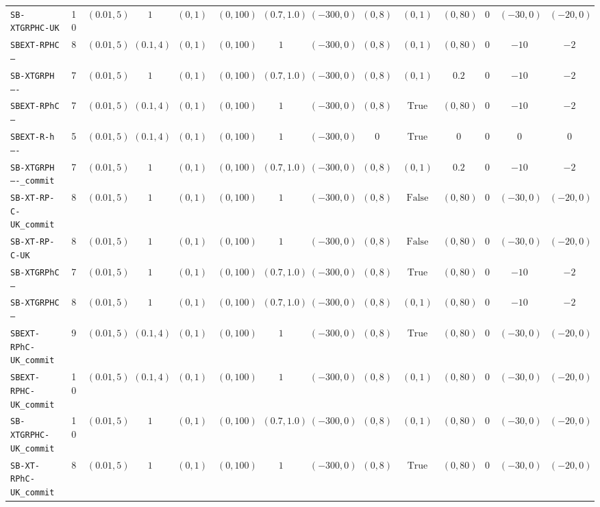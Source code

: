 {\begin{tabular}{lccccccccccccc}
\texttt{SB-XTGRPHC-UK} & 10 & $(0.01,5)$ & $1$ & $(0,1)$ & $(0,100)$ & $(0.7,1.0)$ & $(-300,0)$ & $(0,8)$ & $(0,1)$ & $(0,80)$ & $0$ & $(-30,0)$ & $(-20,0)$ \\
\texttt{SBEXT-RPHC---} & 8 & $(0.01,5)$ & $(0.1,4)$ & $(0,1)$ & $(0,100)$ & $1$ & $(-300,0)$ & $(0,8)$ & $(0,1)$ & $(0,80)$ & $0$ & $-10$ & $-2$ \\
\texttt{SB-XTGRPH----} & 7 & $(0.01,5)$ & $1$ & $(0,1)$ & $(0,100)$ & $(0.7,1.0)$ & $(-300,0)$ & $(0,8)$ & $(0,1)$ & $0.2$ & $0$ & $-10$ & $-2$ \\
\texttt{SBEXT-RPhC---} & 7 & $(0.01,5)$ & $(0.1,4)$ & $(0,1)$ & $(0,100)$ & $1$ & $(-300,0)$ & $(0,8)$ & $\mathrm{True}$ & $(0,80)$ & $0$ & $-10$ & $-2$ \\
\texttt{SBEXT-R-h----} & 5 & $(0.01,5)$ & $(0.1,4)$ & $(0,1)$ & $(0,100)$ & $1$ & $(-300,0)$ & $0$ & $\mathrm{True}$ & $0$ & $0$ & $0$ & $0$ \\
\texttt{SB-XTGRPH----_commit} & 7 & $(0.01,5)$ & $1$ & $(0,1)$ & $(0,100)$ & $(0.7,1.0)$ & $(-300,0)$ & $(0,8)$ & $(0,1)$ & $0.2$ & $0$ & $-10$ & $-2$ \\
\texttt{SB-XT-RP-C-UK_commit} & 8 & $(0.01,5)$ & $1$ & $(0,1)$ & $(0,100)$ & $1$ & $(-300,0)$ & $(0,8)$ & $\mathrm{False}$ & $(0,80)$ & $0$ & $(-30,0)$ & $(-20,0)$ \\
\texttt{SB-XT-RP-C-UK} & 8 & $(0.01,5)$ & $1$ & $(0,1)$ & $(0,100)$ & $1$ & $(-300,0)$ & $(0,8)$ & $\mathrm{False}$ & $(0,80)$ & $0$ & $(-30,0)$ & $(-20,0)$ \\
\texttt{SB-XTGRPhC---} & 7 & $(0.01,5)$ & $1$ & $(0,1)$ & $(0,100)$ & $(0.7,1.0)$ & $(-300,0)$ & $(0,8)$ & $\mathrm{True}$ & $(0,80)$ & $0$ & $-10$ & $-2$ \\
\texttt{SB-XTGRPHC---} & 8 & $(0.01,5)$ & $1$ & $(0,1)$ & $(0,100)$ & $(0.7,1.0)$ & $(-300,0)$ & $(0,8)$ & $(0,1)$ & $(0,80)$ & $0$ & $-10$ & $-2$ \\
\texttt{SBEXT-RPhC-UK_commit} & 9 & $(0.01,5)$ & $(0.1,4)$ & $(0,1)$ & $(0,100)$ & $1$ & $(-300,0)$ & $(0,8)$ & $\mathrm{True}$ & $(0,80)$ & $0$ & $(-30,0)$ & $(-20,0)$ \\
\texttt{SBEXT-RPHC-UK_commit} & 10 & $(0.01,5)$ & $(0.1,4)$ & $(0,1)$ & $(0,100)$ & $1$ & $(-300,0)$ & $(0,8)$ & $(0,1)$ & $(0,80)$ & $0$ & $(-30,0)$ & $(-20,0)$ \\
\texttt{SB-XTGRPHC-UK_commit} & 10 & $(0.01,5)$ & $1$ & $(0,1)$ & $(0,100)$ & $(0.7,1.0)$ & $(-300,0)$ & $(0,8)$ & $(0,1)$ & $(0,80)$ & $0$ & $(-30,0)$ & $(-20,0)$ \\
\texttt{SB-XT-RPhC-UK_commit} & 8 & $(0.01,5)$ & $1$ & $(0,1)$ & $(0,100)$ & $1$ & $(-300,0)$ & $(0,8)$ & $\mathrm{True}$ & $(0,80)$ & $0$ & $(-30,0)$ & $(-20,0)$ \\

\end{tabular}}

